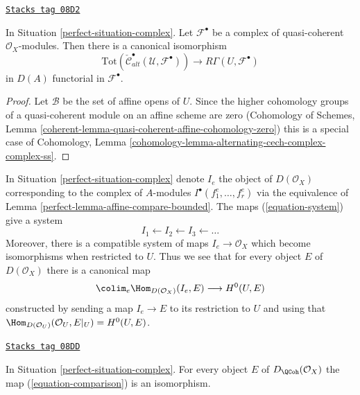 \begin{lemma}
\label{perfect-lemma-alternating-cech-complex-complex-computes-cohomology}
\href{https://stacks.math.columbia.edu/tag/08D2}{\texttt{Stacks tag 08D2}}

In Situation \ref{perfect-situation-complex}. Let $\mathcal{F}^\bullet$
be a complex of quasi-coherent $\mathcal{O}_X$-modules. Then
there is a canonical isomorphism
$$
\text{Tot}(\check{\mathcal{C}}_{alt}^\bullet(\mathcal{U}, \mathcal{F}^\bullet))
\longrightarrow
R\Gamma(U, \mathcal{F}^\bullet)
$$
in $D(A)$ functorial in $\mathcal{F}^\bullet$.
\end{lemma}

\begin{proof}
Let $\mathcal{B}$ be the set of affine opens of $U$. Since the higher
cohomology groups of a quasi-coherent module on an affine scheme are zero
(Cohomology of Schemes, Lemma
\ref{coherent-lemma-quasi-coherent-affine-cohomology-zero})
this is a special case of
Cohomology, Lemma \ref{cohomology-lemma-alternating-cech-complex-complex-ss}.
\end{proof}

In Situation \ref{perfect-situation-complex} denote $I_e$ the object of
$D(\mathcal{O}_X)$ corresponding to the complex of $A$-modules
$I^\bullet(f_1^e, \ldots, f_r^e)$ via the equivalence of
Lemma \ref{perfect-lemma-affine-compare-bounded}. The maps
(\ref{equation-system}) give a system
$$
I_1 \leftarrow
I_2 \leftarrow
I_3 \leftarrow \ldots
$$
Moreover, there is a compatible system of maps $I_e \to \mathcal{O}_X$
which become isomorphisms when restricted to $U$. Thus we see that for
every object $E$ of $D(\mathcal{O}_X)$ there is a canonical map
\begin{equation}
\label{equation-comparison}
\colim_e \Hom_{D(\mathcal{O}_X)}(I_e, E) \longrightarrow H^0(U, E)
\end{equation}
constructed by sending a map $I_e \to E$ to its restriction to $U$
and using that
$\Hom_{D(\mathcal{O}_U)}(\mathcal{O}_U, E|_U) = H^0(U, E)$.

\begin{proposition}
\label{perfect-proposition-represent-cohomology-class-on-open}
\href{https://stacks.math.columbia.edu/tag/08DD}{\texttt{Stacks tag 08DD}}

In Situation \ref{perfect-situation-complex}. For every object $E$
of $D_\QCoh(\mathcal{O}_X)$ the map
(\ref{equation-comparison}) is an isomorphism.
\end{proposition}

